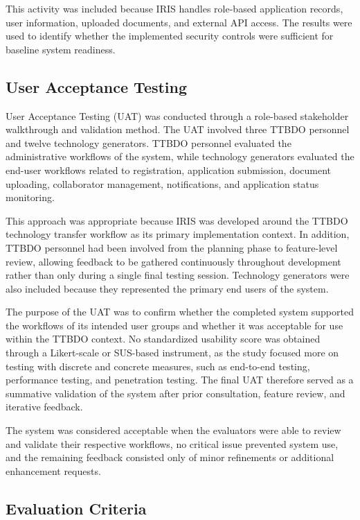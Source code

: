 This activity was included because IRIS handles role-based application records, user information, uploaded documents, and external API access. The results were used to identify whether the implemented security controls were sufficient for baseline system readiness.

\FloatBarrier

\subsection{User Acceptance Testing}

User Acceptance Testing (UAT) was conducted through a role-based stakeholder walkthrough and validation method. The UAT involved three TTBDO personnel and twelve technology generators. TTBDO personnel evaluated the administrative workflows of the system, while technology generators evaluated the end-user workflows related to registration, application submission, document uploading, collaborator management, notifications, and application status monitoring.

This approach was appropriate because IRIS was developed around the TTBDO technology transfer workflow as its primary implementation context. In addition, TTBDO personnel had been involved from the planning phase to feature-level review, allowing feedback to be gathered continuously throughout development rather than only during a single final testing session. Technology generators were also included because they represented the primary end users of the system.

The purpose of the UAT was to confirm whether the completed system supported the workflows of its intended user groups and whether it was acceptable for use within the TTBDO context. No standardized usability score was obtained through a Likert-scale or SUS-based instrument, as the study focused more on testing with discrete and concrete measures, such as end-to-end testing, performance testing, and penetration testing. The final UAT therefore served as a summative validation of the system after prior consultation, feature review, and iterative feedback.

The system was considered acceptable when the evaluators were able to review and validate their respective workflows, no critical issue prevented system use, and the remaining feedback consisted only of minor refinements or additional enhancement requests.

\FloatBarrier

\subsection{Evaluation Criteria}

